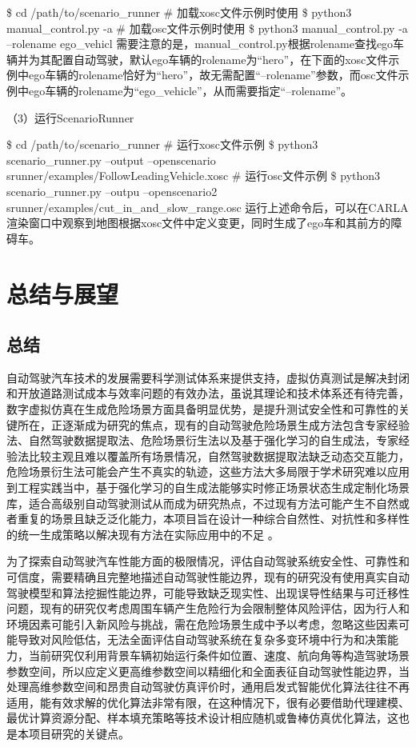 \$ cd /path/to/scenario\_runner
\# 加载xosc文件示例时使用
\$ python3 manual\_control.py  -a
\# 加载osc文件示例时使用
\$ python3 manual\_control.py  -a --rolename ego\_vehicl
需要注意的是，manual\_control.py根据rolename查找ego车辆并为其配置自动驾驶，默认ego车辆的rolename为“hero”，在下面的xosc文件示例中ego车辆的rolename恰好为“hero”，故无需配置“--rolename”参数，而osc文件示例中ego车辆的rolename为“ego\_vehicle”，从而需要指定“--rolename”。

（3）运行ScenarioRunner

\$ cd /path/to/scenario\_runner
\# 运行xosc文件示例
\$ python3 scenario\_runner.py --output --openscenario srunner/examples/FollowLeadingVehicle.xosc
\# 运行osc文件示例
\$ python3 scenario\_runner.py --outpu --openscenario2 srunner/examples/cut\_in\_and\_slow\_range.osc
运行上述命令后，可以在CARLA渲染窗口中观察到地图根据xosc文件中定义变更，同时生成了ego车和其前方的障碍车。
\newpage

\section{总结与展望}

\subsection{总结}
自动驾驶汽车技术的发展需要科学测试体系来提供支持，虚拟仿真测试是解决封闭和开放道路测试成本与效率问题的有效办法，虽说其理论和技术体系还有待完善，数字虚拟仿真在生成危险场景方面具备明显优势，是提升测试安全性和可靠性的关键所在，正逐渐成为研究的焦点，现有的自动驾驶危险场景生成方法包含专家经验法、自然驾驶数据提取法、危险场景衍生法以及基于强化学习的自生成法，专家经验法比较主观且难以覆盖所有场景情况，自然驾驶数据提取法缺乏动态交互能力，危险场景衍生法可能会产生不真实的轨迹，这些方法大多局限于学术研究难以应用到工程实践当中，基于强化学习的自生成法能够实时修正场景状态生成定制化场景库，适合高级别自动驾驶测试从而成为研究热点，不过现有方法可能产生不自然或者重复的场景且缺乏泛化能力，本项目旨在设计一种综合自然性、对抗性和多样性的统一生成策略以解决现有方法在实际应用中的不足 \cite{石娟2017行人自动紧急制动系统测试评价方法研究}。

为了探索自动驾驶汽车性能方面的极限情况，评估自动驾驶系统安全性、可靠性和可信度，需要精确且完整地描述自动驾驶性能边界，现有的研究没有使用真实自动驾驶模型和算法挖掘性能边界，可能导致缺乏现实性、出现误导性结果与可迁移性问题，现有的研究仅考虑周围车辆产生危险行为会限制整体风险评估，因为行人和环境因素可能引入新风险与挑战，需在危险场景生成中予以考虑，忽略这些因素可能导致对风险低估，无法全面评估自动驾驶系统在复杂多变环境中行为和决策能力，当前研究仅利用背景车辆初始运行条件如位置、速度、航向角等构造驾驶场景参数空间，所以应定义更高维参数空间以精细化和全面表征自动驾驶性能边界，当处理高维参数空间和昂贵自动驾驶仿真评价时，通用启发式智能优化算法往往不再适用，能有效求解的优化算法非常有限，在这种情况下，很有必要借助代理建模、最优计算资源分配、样本填充策略等技术设计相应随机或鲁棒仿真优化算法，这也是本项目研究的关键点。

